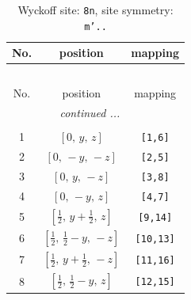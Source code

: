 \documentclass[fleqn,8pt]{jsarticle}
\begin{document}
\begin{longtable}{ccc}
\caption{Wyckoff site: {\tt 8n}, site symmetry: {\tt m'..}}
 \\
 \hline \hline
No. & position & mapping \\ \hline \endfirsthead

\multicolumn{2}{l}{\tablename\ \thetable{}} \\
 \hline \hline
No. & position & mapping \\ \hline \endhead

 \hline \hline
\multicolumn{2}{r}{\footnotesize\it continued ...} \\ \endfoot

 \hline \hline
\multicolumn{2}{r}{} \\ \endlastfoot

1 & $\left[ 0,\, y,\, z \right]$ & {\tt [1,6]} \\ \hline
2 & $\left[ 0,\, - y,\, - z \right]$ & {\tt [2,5]} \\ \hline
3 & $\left[ 0,\, y,\, - z \right]$ & {\tt [3,8]} \\ \hline
4 & $\left[ 0,\, - y,\, z \right]$ & {\tt [4,7]} \\ \hline
5 & $\left[ \frac{1}{2},\, y + \frac{1}{2},\, z \right]$ & {\tt [9,14]} \\ \hline
6 & $\left[ \frac{1}{2},\, \frac{1}{2} - y,\, - z \right]$ & {\tt [10,13]} \\ \hline
7 & $\left[ \frac{1}{2},\, y + \frac{1}{2},\, - z \right]$ & {\tt [11,16]} \\ \hline
8 & $\left[ \frac{1}{2},\, \frac{1}{2} - y,\, z \right]$ & {\tt [12,15]} \\
\end{longtable}
\renewcommand{\arraystretch}{1.2}
\end{document}
